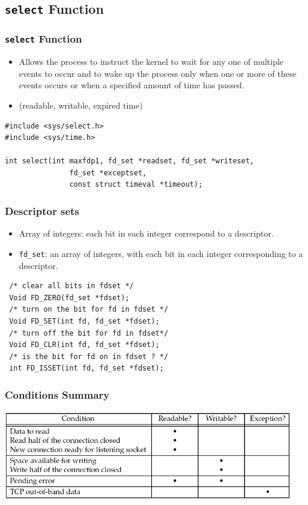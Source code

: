 \documentclass[notes,serif]{beamer}
\begin{document}
\subsection{\texttt{select} Function}
\begin{frame}[containsverbatim]
\frametitle{\texttt{select} Function}
\begin{itemize}
  \item Allows the process to instruct the kernel to wait for any one of multiple events
  to occur and to wake up the process only when one or more of these events
  occurs or when a specified amount of time has passed.
  \item (readable, writable, expired time)
\end{itemize}
{\scriptsize
  \begin{verbatim}
#include <sys/select.h>
#include <sys/time.h>

int select(int maxfdp1, fd_set *readset, fd_set *writeset,
               fd_set *exceptset,
               const struct timeval *timeout);
  \end{verbatim}
}
\end{frame}

\begin{frame}[containsverbatim]
\frametitle{Descriptor sets}
\begin{itemize}
  \item Array of integers: each bit in each integer correspond to a descriptor.
  \item \texttt{fd\_set}: an array of integers, with each bit in each integer corresponding to a
descriptor.
\end{itemize}
{\scriptsize
\begin{verbatim}
 /* clear all bits in fdset */
 Void FD_ZERO(fd_set *fdset);
 /* turn on the bit for fd in fdset */
 Void FD_SET(int fd, fd_set *fdset);
 /* turn off the bit for fd in fdset*/
 Void FD_CLR(int fd, fd_set *fdset);
 /* is the bit for fd on in fdset ? */
 int FD_ISSET(int fd, fd_set *fdset);
\end{verbatim}
}
\end{frame}

\begin{frame}
\frametitle{Conditions Summary}
  \begin{center}
  \includegraphics[width=.9\textwidth]{figs/06fig07.png}
  \end{center}
\end{frame}
\end{document}
